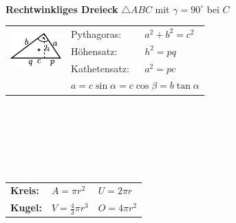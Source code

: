 \documentclass[fs, footer]{latex4ei}
\begin{document}
\begin{multicols*}{4}
{\\[1em]
\textbf{Rechtwinkliges Dreieck} $\triangle ABC$ mit $\gamma = 90^\circ$ bei $C$\\[0.2em]
	\begin{tabular}{@{}lll}
	\multirow{3}{2cm}{ \includegraphics[scale = 1.4]{./img/math/rechtwinklig.pdf} } & Pythagoras: & \hspace{-2.5mm} \large $a^2 + b^2 = c^2$\\[0.1em]
	& Höhensatz: & \hspace{-2.5mm} {\large $h^2 = pq$}\\[0.1em]
	& Kathetensatz: & \hspace{-2.5mm} \large $a^2 = pc$\\[0.1em]
	& \multicolumn{2}{l}{\large $a = c \sin \alpha = c \cos \beta = b \tan \alpha$}\\ 
\end{tabular}\\
\\[1em]
 \qquad
{}\\
\\ \\
 \qquad
\parbox{4cm}{
\begin{tabular}{lll}
\textbf{Kreis:} & $A = \pi r^2$ & $U =2\pi r$ \\ 
\textbf{Kugel:} & $V = \frac{4}{3} \pi r^3$ & $O = 4 \pi r^2$\\
\end{tabular} }


}
\end{multicols*}
\end{document}
